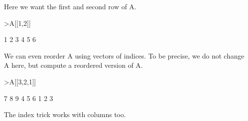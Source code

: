 \documentclass{article}
\begin{document}
\begin{eulernotebook}
\begin{eulercomment}
\begin{eulercomment}
\begin{eulercomment}
\begin{eulercomment}
\begin{eulercomment}
\begin{eulercomment}
\begin{eulercomment}
Here we want the first and second row of A.
\end{eulercomment}
\begin{eulerprompt}
>A[[1,2]]
\end{eulerprompt}
\begin{euleroutput}
              1             2             3 
              4             5             6 
\end{euleroutput}
\begin{eulercomment}
We can even reorder A using vectors of indices. To be precise, we do
not change A here, but compute a reordered version of A.
\end{eulercomment}
\begin{eulerprompt}
>A[[3,2,1]]
\end{eulerprompt}
\begin{euleroutput}
              7             8             9 
              4             5             6 
              1             2             3 
\end{euleroutput}
\begin{eulercomment}
The index trick works with columns too.


\end{eulercomment}
\end{eulercomment}
\end{eulercomment}
\end{eulercomment}
\end{eulercomment}
\end{eulercomment}
\end{eulercomment}
\end{eulernotebook}
\end{document}
